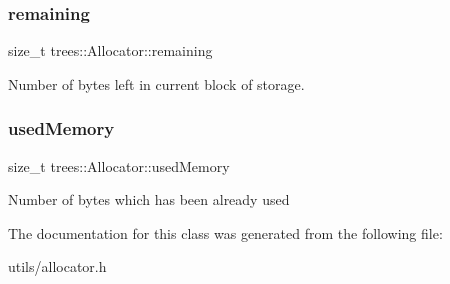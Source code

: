 \subsubsection{\texorpdfstring{remaining}{remaining}}
{\footnotesize\ttfamily size\+\_\+t trees\+::\+Allocator\+::remaining\hspace{0.3cm}{\ttfamily [protected]}}

Number of bytes left in current block of storage. \mbox{\label{classtrees_1_1_allocator_a9a6f444512dd3e66121a821e114207dd}} 
\subsubsection{\texorpdfstring{used\+Memory}{usedMemory}}
{\footnotesize\ttfamily size\+\_\+t trees\+::\+Allocator\+::used\+Memory\hspace{0.3cm}{\ttfamily [protected]}}

Number of bytes which has been already used 

The documentation for this class was generated from the following file\+:\begin{DoxyCompactItemize}
\item 
utils/allocator.\+h\end{DoxyCompactItemize}
